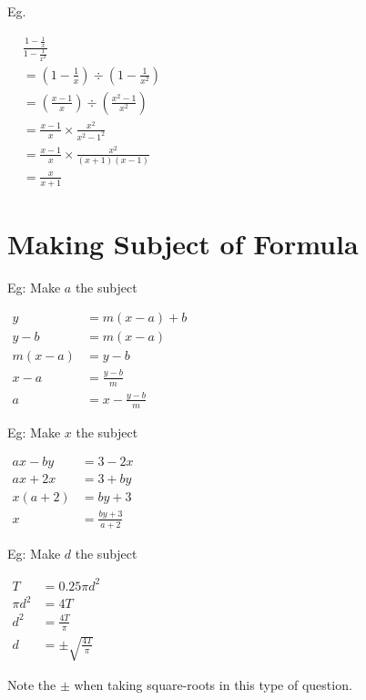 \documentclass[twocolumn]{article}
\begin{document}
\bigskip 

\noindent 
Eg. 

\noindent 
$\begin{aligned} & \frac{1-\frac{1}{x}}{1-\frac{1}{x^2}} \\ & =\left(1-\frac{1}{x}\right) \div\left(1-\frac{1}{x^2}\right) \\ & =\left(\frac{x-1}{x}\right) \div\left(\frac{x^2-1}{x^2}\right) \\ & =\frac{x-1}{x} \times \frac{x^2}{x^2-1^2} \\ & =\frac{x-1}{x} \times \frac{x^2}{(x+1)(x-1)} \\ & =\frac{x}{x+1}\end{aligned}$

\section*{Making Subject of Formula}

\bigskip 

\noindent 
Eg: Make $a$ the subject

\noindent 
$\begin{aligned} y & = m(x-a)+b \\ y-b & =m(x-a) \\ m(x-a) & =y-b \\ x-a & =\frac{y-b}{m} \\ a & =x-\frac{y-b}{m}\end{aligned}$

\bigskip 

\noindent 
Eg: Make $x$ the subject

\noindent 
$\begin{aligned} a x-b y & =3-2 x \\ a x+2 x & =3+b y \\ x(a+2) & =b y+3 \\ x & =\frac{b y+3}{a+2}\end{aligned}$

\bigskip 

\noindent 
Eg: Make $d$ the subject

\noindent 
$\begin{aligned} T & =0.25 \pi d^2 \\ \pi d^2 & =4 T \\ d^2 & =\frac{4 T}{\pi} \\ d & = \pm \sqrt{\frac{4 T}{\pi}}\end{aligned}$

\noindent
Note the $\pm$ when taking square-roots in this type of question.
\end{document}
